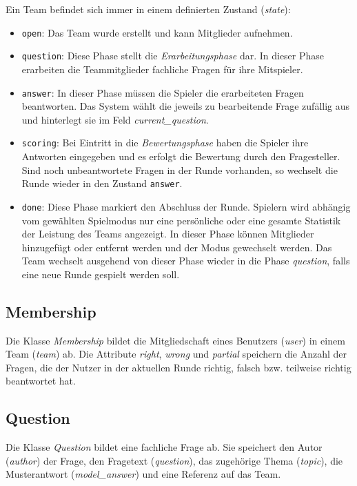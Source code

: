 \documentclass[a4paper,11pt,listof=numbered,glossary=totoc,parskip=half,toc=bib]{scrreprt}
\begin{document}
	Ein Team befindet sich immer in einem definierten Zustand (\textit{state}):
	
	\begin{itemize}
		\item \texttt{open}: Das Team wurde erstellt und kann Mitglieder aufnehmen.
		\item \texttt{question}: Diese Phase stellt die \textit{Erarbeitungsphase} dar. In dieser Phase erarbeiten die Teammitglieder fachliche Fragen für ihre Mitspieler. 
		\item \texttt{answer}: In dieser Phase müssen die Spieler die erarbeiteten Fragen beantworten. Das System wählt die jeweils zu bearbeitende Frage zufällig aus und hinterlegt sie im Feld \textit{current\_{}question}.
		\item \texttt{scoring}: Bei Eintritt in die \textit{Bewertungsphase} haben die Spieler ihre Antworten eingegeben und es erfolgt die Bewertung durch den Fragesteller. Sind noch unbeantwortete Fragen in der Runde vorhanden, so wechselt die Runde wieder in den Zustand \texttt{answer}.
		
		\item \texttt{done}: Diese Phase markiert den Abschluss der Runde. Spielern wird abhängig vom gewählten Spielmodus nur eine persönliche oder eine gesamte Statistik der Leistung des Teams angezeigt. In dieser Phase können Mitglieder hinzugefügt oder entfernt werden und der Modus gewechselt werden. Das Team wechselt ausgehend von dieser Phase wieder in die Phase \textit{question}, falls eine neue Runde gespielt werden soll.
		
	\end{itemize}
	
	\subsection{Membership}
	Die Klasse \textit{Membership} bildet die Mitgliedschaft eines Benutzers (\textit{user}) in einem Team (\textit{team}) ab.
	Die Attribute \textit{right}, \textit{wrong} und \textit{partial} speichern die Anzahl der Fragen, die der Nutzer in der aktuellen Runde richtig, falsch bzw. teilweise richtig beantwortet hat. 
	
	\subsection{Question}
	Die Klasse \textit{Question} bildet eine fachliche Frage ab. Sie speichert den Autor (\textit{author}) der Frage, den Fragetext (\textit{question}), das zugehörige Thema (\textit{topic}), die Musterantwort (\textit{model\_{}answer}) und eine Referenz auf das Team.
	
\end{document}
